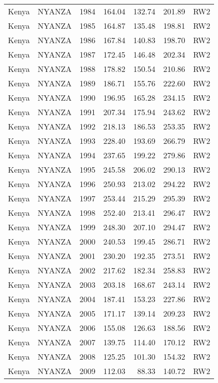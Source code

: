 \begin{longtable}{lllrrrl}
  Kenya & NYANZA & 1984 & 164.04 & 132.74 & 201.89 & RW2 \\ 
  Kenya & NYANZA & 1985 & 164.87 & 135.48 & 198.81 & RW2 \\ 
  Kenya & NYANZA & 1986 & 167.84 & 140.83 & 198.70 & RW2 \\ 
  Kenya & NYANZA & 1987 & 172.45 & 146.48 & 202.34 & RW2 \\ 
  Kenya & NYANZA & 1988 & 178.82 & 150.54 & 210.86 & RW2 \\ 
  Kenya & NYANZA & 1989 & 186.71 & 155.76 & 222.60 & RW2 \\ 
  Kenya & NYANZA & 1990 & 196.95 & 165.28 & 234.15 & RW2 \\ 
  Kenya & NYANZA & 1991 & 207.34 & 175.94 & 243.62 & RW2 \\ 
  Kenya & NYANZA & 1992 & 218.13 & 186.53 & 253.35 & RW2 \\ 
  Kenya & NYANZA & 1993 & 228.40 & 193.69 & 266.79 & RW2 \\ 
  Kenya & NYANZA & 1994 & 237.65 & 199.22 & 279.86 & RW2 \\ 
  Kenya & NYANZA & 1995 & 245.58 & 206.02 & 290.13 & RW2 \\ 
  Kenya & NYANZA & 1996 & 250.93 & 213.02 & 294.22 & RW2 \\ 
  Kenya & NYANZA & 1997 & 253.44 & 215.29 & 295.39 & RW2 \\ 
  Kenya & NYANZA & 1998 & 252.40 & 213.41 & 296.47 & RW2 \\ 
  Kenya & NYANZA & 1999 & 248.30 & 207.10 & 294.47 & RW2 \\ 
  Kenya & NYANZA & 2000 & 240.53 & 199.45 & 286.71 & RW2 \\ 
  Kenya & NYANZA & 2001 & 230.20 & 192.35 & 273.51 & RW2 \\ 
  Kenya & NYANZA & 2002 & 217.62 & 182.34 & 258.83 & RW2 \\ 
  Kenya & NYANZA & 2003 & 203.18 & 168.67 & 243.14 & RW2 \\ 
  Kenya & NYANZA & 2004 & 187.41 & 153.23 & 227.86 & RW2 \\ 
  Kenya & NYANZA & 2005 & 171.17 & 139.14 & 209.23 & RW2 \\ 
  Kenya & NYANZA & 2006 & 155.08 & 126.63 & 188.56 & RW2 \\ 
  Kenya & NYANZA & 2007 & 139.75 & 114.40 & 170.12 & RW2 \\ 
  Kenya & NYANZA & 2008 & 125.25 & 101.30 & 154.32 & RW2 \\ 
  Kenya & NYANZA & 2009 & 112.03 & 88.33 & 140.72 & RW2 \\ 

\end{longtable}
